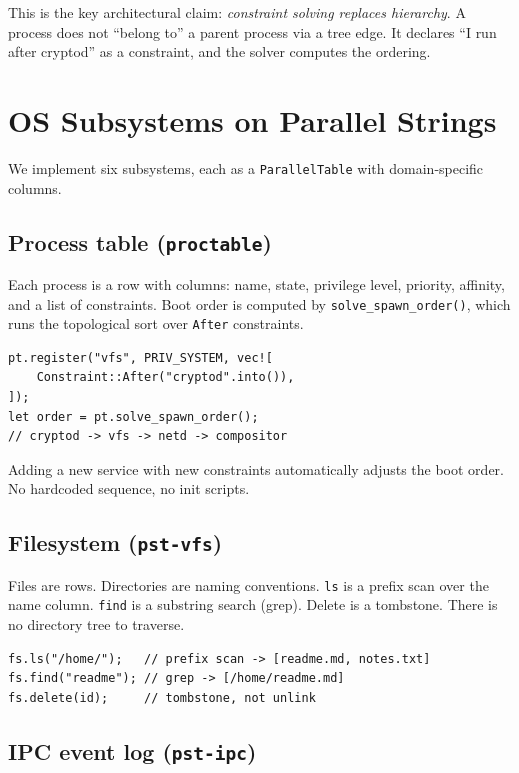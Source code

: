 \documentclass[11pt,a4paper]{article}
\begin{document}
This is the key architectural claim: \emph{constraint solving replaces hierarchy}. A process does not ``belong to'' a parent process via a tree edge. It declares ``I run after cryptod'' as a constraint, and the solver computes the ordering.

\section{OS Subsystems on Parallel Strings}
\label{sec:subsystems}

We implement six subsystems, each as a \texttt{ParallelTable} with domain-specific columns.

\subsection{Process table (\texttt{proctable})}

Each process is a row with columns: name, state, privilege level, priority, affinity, and a list of constraints. Boot order is computed by \texttt{solve\_spawn\_order()}, which runs the topological sort over \texttt{After} constraints.

\begin{lstlisting}
pt.register("vfs", PRIV_SYSTEM, vec![
    Constraint::After("cryptod".into()),
]);
let order = pt.solve_spawn_order();
// cryptod -> vfs -> netd -> compositor
\end{lstlisting}

Adding a new service with new constraints automatically adjusts the boot order. No hardcoded sequence, no init scripts.

\subsection{Filesystem (\texttt{pst-vfs})}

Files are rows. Directories are naming conventions. \texttt{ls} is a prefix scan over the name column. \texttt{find} is a substring search (grep). Delete is a tombstone. There is no directory tree to traverse.

\begin{lstlisting}
fs.ls("/home/");   // prefix scan -> [readme.md, notes.txt]
fs.find("readme"); // grep -> [/home/readme.md]
fs.delete(id);     // tombstone, not unlink
\end{lstlisting}

\subsection{IPC event log (\texttt{pst-ipc})}
\end{document}
